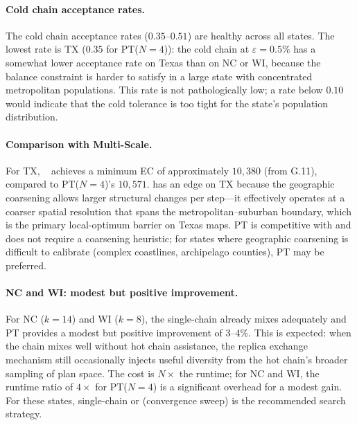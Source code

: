 \paragraph{Cold chain acceptance rates.}
The cold chain acceptance rates ($0.35$--$0.51$) are healthy across all states.
The lowest rate is TX ($0.35$ for PT($N=4$)): the cold chain at $\varepsilon=0.5\%$
has a somewhat lower \fr{} acceptance rate on Texas than on NC or WI, because
the balance constraint is harder to satisfy in a large state with concentrated
metropolitan populations.
This rate is not pathologically low; a rate below $0.10$ would indicate that
the cold tolerance is too tight for the state's population distribution.

\paragraph{Comparison with Multi-Scale.}
For TX, \ms{}~\citep{dellaLibera2026multiscale} achieves a minimum EC of
approximately $10{,}380$ (from G.11), compared to PT($N=4$)'s $10{,}571$.
\ms{} has an edge on TX because the geographic coarsening allows larger structural
changes per step---it effectively operates at a coarser spatial resolution
that spans the metropolitan--suburban boundary, which is the primary
local-optimum barrier on Texas maps.
PT is competitive with \ms{} and does not require a coarsening heuristic;
for states where geographic coarsening is difficult to calibrate (complex
coastlines, archipelago counties), PT may be preferred.

\paragraph{NC and WI: modest but positive improvement.}
For NC ($k=14$) and WI ($k=8$), the single-chain \fr{} already mixes
adequately and PT provides a modest but positive improvement of 3--4\%.
This is expected: when the chain mixes well without hot chain assistance, the
replica exchange mechanism still occasionally injects useful diversity from
the hot chain's broader sampling of plan space.
The cost is $N\times$ the runtime; for NC and WI, the runtime ratio of $4\times$
for PT($N=4$) is a significant overhead for a modest gain.
For these states, single-chain \fr{} or \cs{} (convergence sweep) is the
recommended search strategy.
